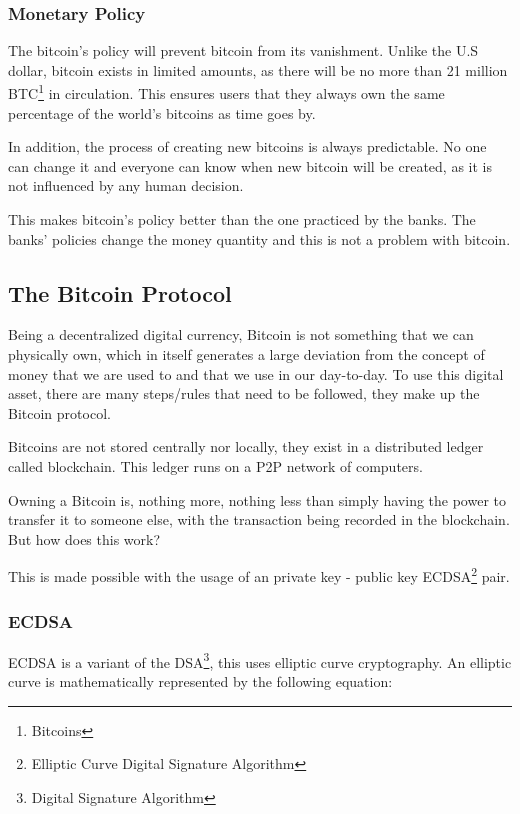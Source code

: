 \documentclass{article}
\newcommand\tab[1][1cm]{\hspace*{#1}}
\begin{document}
\subsubsection{Monetary Policy}

\tab The bitcoin's policy will prevent bitcoin from its vanishment. Unlike the U.S dollar, bitcoin exists in limited amounts, as there will be no more than 21 million BTC\footnote{Bitcoins} in circulation. This ensures users that they always own the same percentage of the world's bitcoins as time goes by.

In addition, the process of creating new bitcoins is always predictable. No one can change it and everyone can know when new bitcoin will be created, as it is not influenced by any human decision. 

This makes bitcoin's policy better than the one practiced by the banks. The banks' policies change the money quantity and this is not a problem with bitcoin.

\subsection{The Bitcoin Protocol}

\tab Being a decentralized digital currency, Bitcoin is not something that we can physically own, which in itself generates a large deviation from the concept of money that we are used to and that we use in our day-to-day. To use this digital asset, there are many steps/rules that need to be followed, they make up the Bitcoin protocol.

Bitcoins are not stored centrally nor locally, they exist in a distributed ledger called blockchain. This ledger runs on a P2P network of computers. 

Owning a Bitcoin is, nothing more, nothing less than simply having the power to transfer it to someone else, with the transaction being recorded in the blockchain. But how does this work?

This is made possible with the usage of an private key - public key ECDSA\footnote{Elliptic Curve Digital Signature Algorithm} pair.

\subsubsection{ECDSA}

\tab ECDSA is a variant of the DSA\footnote{Digital Signature Algorithm}, this uses elliptic curve cryptography. An elliptic curve is mathematically represented by the following equation:
\end{document}

